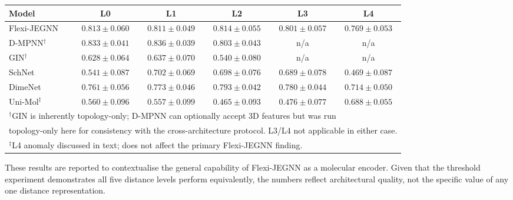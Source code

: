 \documentclass[pdflatex,sn-vancouver-num]{sn-jnl}%
\theoremstyle{thmstyleone}%
\theoremstyle{thmstyletwo}%
\theoremstyle{thmstylethree}%
\renewenvironment{table}[1][htbp]%
{\begin{tableorg}[#1]%
\begin{center}
\begin{adjustbox}{max width=\linewidth}
\begin{threeparttable}
\tablebodyfont%
\renewcommand\footnotetext[2][]{{\removelastskip\vskip3pt%
\let\tablebodyfont\tablefootnotefont%
\hskip0pt\if!##1!\else{\smash{$^{##1}$}}\fi##2\par}}%
}{\end{threeparttable}\end{adjustbox}\end{center}\end{tableorg}}
\begin{document}
\begin{table}[htbp]
  \centering
  \caption{QM9 HOMO--LUMO gap regression (Pearson~$r$, mean~$\pm$~std, $n{=}20$ seeds) across all
  model families and distance levels, re-implemented under the identical scaffold-split
  protocol.  D-MPNN (which can optionally accept 3D features \cite{yang2019dmpnn} but was run topology-only here for cross-architecture consistency) and GIN do not receive
  L3/L4 inputs (n/a).  Results are presented as context only; the primary geometric
  sensitivity finding is established by Flexi-JEGNN's restricted ANOVA (L0--L3), which
  remains non-significant ($p = 0.216$).}
  \label{tab:qm9_cross_model}
  \renewcommand{\arraystretch}{1.2}
  \scriptsize
  \begin{tabular}{|l|c|c|c|c|c|}
    \hline
    \textbf{Model} & \textbf{L0} & \textbf{L1} & \textbf{L2} & \textbf{L3} & \textbf{L4} \\
    \hline
    Flexi-JEGNN & $0.813\pm0.060$ & $0.811\pm0.049$ & $0.814\pm0.055$ & $0.801\pm0.057$ & $0.769\pm0.053$ \\
    \hline
    D-MPNN$^\dagger$ & $0.833\pm0.041$ & $0.836\pm0.039$ & $0.803\pm0.043$ & n/a & n/a \\
    \hline
    GIN$^\dagger$ & $0.628\pm0.064$ & $0.637\pm0.070$ & $0.540\pm0.080$ & n/a & n/a \\
    \hline
    SchNet & $0.541\pm0.087$ & $0.702\pm0.069$ & $0.698\pm0.076$ & $0.689\pm0.078$ & $0.469\pm0.087$ \\
    \hline
    DimeNet & $0.761\pm0.056$ & $0.773\pm0.046$ & $0.793\pm0.042$ & $0.780\pm0.044$ & $0.714\pm0.050$ \\
    \hline
    Uni-Mol$^\ddagger$ & $0.560\pm0.096$ & $0.557\pm0.099$ & $0.465\pm0.093$ & $0.476\pm0.077$ & $0.688\pm0.055$ \\
    \hline
    \multicolumn{6}{l}{\small $^\dagger$GIN is inherently topology-only; D-MPNN can optionally accept 3D features \cite{yang2019dmpnn} but was run} \\
    \multicolumn{6}{l}{\small topology-only here for consistency with the cross-architecture protocol. L3/L4 not applicable in either case.} \\
    \multicolumn{6}{l}{\small $^\ddagger$L4 anomaly discussed in text; does not affect the primary Flexi-JEGNN finding.} \\
  \end{tabular}
\end{table}

These results are reported to contextualise the general capability of Flexi-JEGNN as a molecular encoder.  Given that the threshold experiment
demonstrates all five distance levels perform equivalently, the numbers
reflect architectural quality, not the specific value of any one
distance representation.
\end{document}
